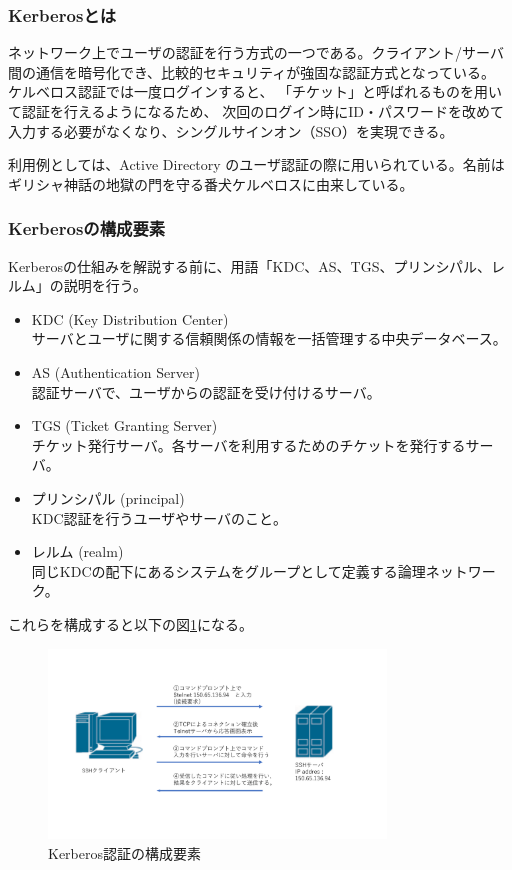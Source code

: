 \documentclass[12pt,a4paper,titlepage]{jsarticle}
\begin{document}
\subsubsection*{Kerberosとは}
ネットワーク上でユーザの認証を行う方式の一つである。クライアント/サーバ間の通信を暗号化でき、比較的セキュリティが強固な認証方式となっている。
ケルベロス認証では一度ログインすると、
「チケット」と呼ばれるものを用いて認証を行えるようになるため、
次回のログイン時にID・パスワードを改めて入力する必要がなくなり、シングルサインオン（SSO）を実現できる。\par 
利用例としては、Active Directory のユーザ認証の際に用いられている。名前はギリシャ神話の地獄の門を守る番犬ケルベロスに由来している。

\subsubsection*{Kerberosの構成要素}
Kerberosの仕組みを解説する前に、用語「KDC、AS、TGS、プリンシパル、レルム」の説明を行う。
\begin{itemize}
    \item KDC (Key Distribution Center)\mbox{}\\サーバとユーザに関する信頼関係の情報を一括管理する中央データベース。
    \item AS (Authentication Server) \mbox{}\\認証サーバで、ユーザからの認証を受け付けるサーバ。
    \item TGS (Ticket Granting Server) \mbox{}\\チケット発行サーバ。各サーバを利用するためのチケットを発行するサーバ。
    \item プリンシパル (principal) \mbox{}\\ KDC認証を行うユーザやサーバのこと。
    \item レルム (realm)\mbox{}\\同じKDCの配下にあるシステムをグループとして定義する論理ネットワーク。
\end{itemize}
これらを構成すると以下の図\ref{KerberosCompornent}になる。
\begin{figure}[h]
    \begin{center}
        \includegraphics[width=0.8\textwidth, page=11]{graphs/network_archtecture.pdf}
        \caption{Kerberos認証の構成要素}
        \label{KerberosCompornent}
    \end{center}
\end{figure}\\
\end{document}
